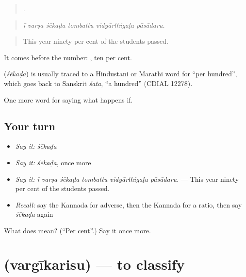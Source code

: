 \begin{quote}
     .
\end{quote}

\begin{quote}
\emph{ī varṣa śēkaḍa tombattu vidyārthigaḷu pāsādaru.}
\end{quote}

\begin{quote}
This year ninety per cent of the students passed.
\end{quote}

It comes before the number:  , ten per cent.

\begin{cousinweb}
\textbf{} (\emph{śēkaḍa}) is usually traced to a Hindustani or Marathi word for \textquotedblleft{}per hundred\textquotedblright{}, which goes back to Sanskrit \emph{śata}, \textquotedblleft{}a hundred\textquotedblright{} (CDIAL 12278).
\end{cousinweb}

\begin{grammarlens}[title={What you've built}]
One more word for saying what happens if.
\end{grammarlens}

\subsection*{Your turn}
\begin{itemize}
\raggedright
  \item \emph{Say it:} \emph{śēkaḍa}
  \item \emph{Say it:} \emph{śēkaḍa}, once more
  \item \emph{Say it:} \emph{ī varṣa śēkaḍa tombattu vidyārthigaḷu pāsādaru.} — This year ninety per cent of the students passed.
  \item \emph{Recall:} say the Kannada for adverse, then the Kannada for a ratio, then say \emph{śēkaḍa} again
\end{itemize}

\begin{tcolorbox}[breakable,colback=teal!4,colframe=teal!35!black,title={Before you move on}]
What does  mean? (\textquotedblleft{}Per cent\textquotedblright{}.) Say it once more.
\end{tcolorbox}
\section[\texorpdfstring{\kn{ವರ್ಗೀಕರಿಸು} (vargīkarisu)}{ವರ್ಗೀಕರಿಸು (vargīkarisu)}]{ (vargīkarisu) — to classify}

